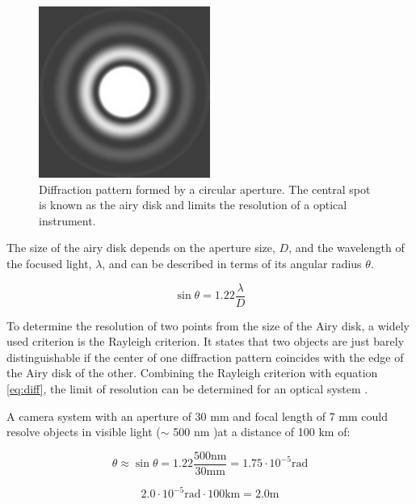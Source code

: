\begin{figure}[H]
\begin{center}
\includegraphics[width=0.5\textwidth]{figures/navtheory/airy}
\caption{Diffraction pattern formed by a circular aperture. The central spot is known as the airy disk and limits the resolution of a optical instrument.}
\label{airy}
\end{center}
\end{figure}

The size of the airy disk depends on the aperture size, $D$, and the wavelength of the focused light, $\lambda$, and can be described in terms of its angular radius $\theta$.

\begin{equation}
\label{eq:diff}
\sin \theta = 1.22 \dfrac{\lambda}{D}
\end{equation}

To determine the resolution of two points from the size of the Airy disk, a widely used criterion is the Rayleigh criterion. It states that two objects are just barely distinguishable if the center of one diffraction pattern coincides with the edge of the Airy disk of the other. Combining the Rayleigh criterion with equation \ref{eq:diff}, the limit of resolution can be determined for an optical system \cite{uniphys}.

A camera system with an aperture of 30 mm and focal length of 7 mm could resolve objects in visible light ($\sim$ 500 nm )at a distance of 100  km of: 

\begin{equation}
\theta\approx \sin \theta=1.22 \dfrac{500 \mathrm{nm}}{30 \mathrm{mm}} = 1.75 \cdot 10^{-5} \mathrm{rad}
\end{equation} 


\begin{equation}
2.0 \cdot 10 ^{-5} \mathrm{rad} \cdot 100 \mathrm{km} = 2.0 \mathrm{m} 
\end{equation}

